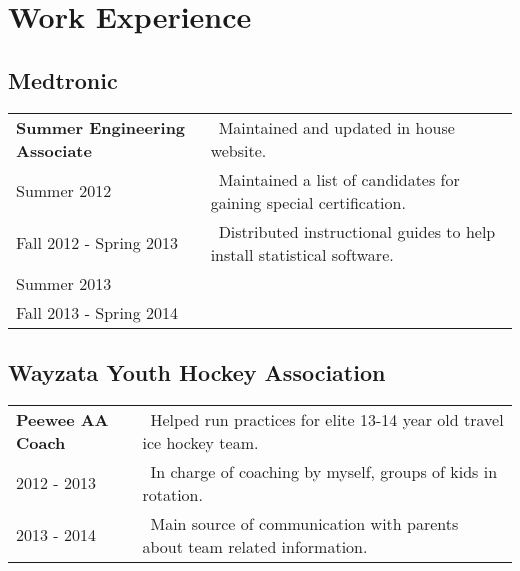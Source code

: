 \documentclass{article}[11pt]
\begin{document}
	\section*{Work Experience}
	\subsection*{Medtronic}
	\begin{tabular}{@{}p{5cm}l}
		\textbf{Summer Engineering Associate} 	& \textbullet\ Maintained and updated in house website.\\
	Summer 2012 			& \textbullet\ Maintained a list of candidates for gaining special certification. \\
	Fall 2012 - Spring 2013 	& \textbullet\ Distributed instructional guides to help install statistical software. \\
	Summer 2013 			& \\
	Fall 2013 - Spring 2014	&
	\end{tabular}
	\hfill
	\subsection*{Wayzata Youth Hockey Association}
	\begin{tabular}{@{}p{5cm}l}
		\textbf{Peewee AA Coach} 		& \textbullet\ Helped run practices for elite 13-14 year old travel ice hockey team. \\
	2012 - 2013 	& \textbullet\ In charge of coaching by myself, groups of kids in rotation. \\
	2013 - 2014 	& \textbullet\ Main source of communication with parents about team related information.
	\end{tabular}
\end{document}
